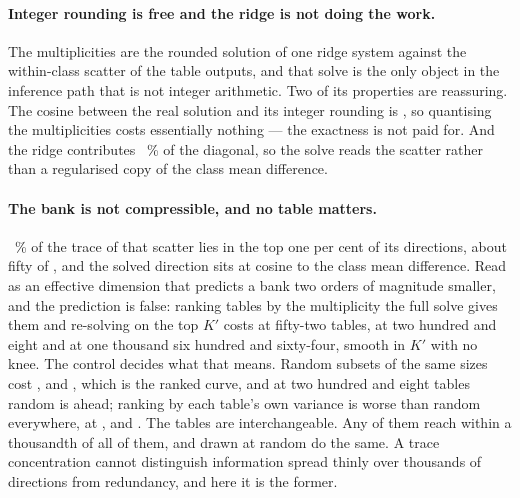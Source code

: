 \documentclass[11pt]{article}
\begin{document}
\paragraph{Integer rounding is free and the ridge is not doing the work.} The
multiplicities are the rounded solution of one ridge system against the
within-class scatter of the table outputs, and that solve is the only object in
the inference path that is not integer arithmetic. Two of its properties are
reassuring. The cosine between the real solution and its integer rounding is
\GramRound{}, so quantising the multiplicities costs essentially nothing --- the
exactness is not paid for. And the ridge contributes \GramRidgeShare{}~\% of the
diagonal, so the solve reads the scatter rather than a regularised copy of the
class mean difference.

\paragraph{The bank is not compressible, and no table matters.} \GramTraceTop{}~\%
of the trace of that scatter lies in the top one per cent of its directions, about
fifty of \TruncFull{}, and the solved direction sits at cosine \GramCos{} to the
class mean difference. Read as an effective dimension that predicts a bank two
orders of magnitude smaller, and the prediction is false: ranking tables by the
multiplicity the full solve gives them and re-solving on the top \(K'\) costs
\TruncMultFifty{} at fifty-two tables, \TruncMultTwoHundred{} at two hundred and eight and
\TruncMultSixteenHundred{} at one thousand six hundred and sixty-four, smooth in \(K'\) with
no knee. The control decides what that means. Random subsets of the same sizes
cost \TruncRandFifty{}, \TruncRandTwoHundred{} and \TruncRandSixteenHundred{}, which is the ranked
curve, and at two hundred and eight tables random is ahead; ranking by each
table's own variance is worse than random everywhere, at \TruncGiniFifty{},
\TruncGiniTwoHundred{} and \TruncGiniSixteenHundred{}. The tables are interchangeable. Any
\TruncWithinMilli{} of them reach within a thousandth of all of them, and
\TruncWithinMilliRand{} drawn at random do the same. A trace concentration cannot
distinguish information spread thinly over thousands of directions from
redundancy, and here it is the former.
\end{document}
